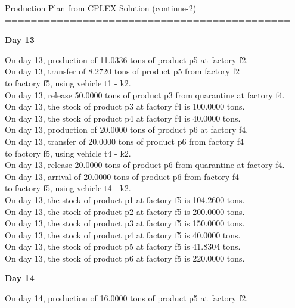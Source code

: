 \begin{table}[H] 
Production Plan from CPLEX Solution (continue-2)
============================================
\vspace{-2.5em}
\begin{multicols}{2}
\tiny
\textbf{Day 13}
\vspace{-1.6em}
\begin{tabbing}
On day 13, production of 11.0336 tons of product p5 at factory f2. \\
On day 13, transfer of 8.2720 tons of product p5 from factory f2 \\ to factory f5, using vehicle t1 - k2. \\
On day 13, release 50.0000 tons of product p3 from quarantine at factory f4. \\
On day 13, the stock of product p3 at factory f4 is 100.0000 tons. \\
On day 13, the stock of product p4 at factory f4 is 40.0000 tons. \\
On day 13, production of 20.0000 tons of product p6 at factory f4. \\
On day 13, transfer of 20.0000 tons of product p6 from factory f4 \\ to factory f5, using vehicle t4 - k2. \\
On day 13, release 20.0000 tons of product p6 from quarantine at factory f4. \\
On day 13, arrival of 20.0000 tons of product p6 from factory f4 \\ to factory f5, using vehicle t4 - k2. \\
On day 13, the stock of product p1 at factory f5 is 104.2600 tons. \\
On day 13, the stock of product p2 at factory f5 is 200.0000 tons. \\
On day 13, the stock of product p3 at factory f5 is 150.0000 tons. \\
On day 13, the stock of product p4 at factory f5 is 40.0000 tons. \\
On day 13, the stock of product p5 at factory f5 is 41.8304 tons. \\
On day 13, the stock of product p6 at factory f5 is 220.0000 tons. \\
\end{tabbing} \vspace{-2.0em}
\textbf{Day 14}
\vspace{-1.6em}
\begin{tabbing}
On day 14, production of 16.0000 tons of product p5 at factory f2. \\

\end{tabbing}
\end{multicols}
\end{table}
